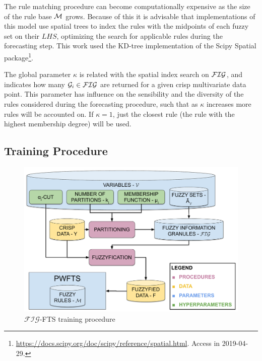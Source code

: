 The rule matching procedure can become computationally expensive as the size of the rule base $\mathcal{M}$ grows. Because of this it is advisable that implementations of this model use spatial trees \citep{Muja2014} to index the rules with the midpoints of each fuzzy set on their $LHS$, optimizing the search for applicable rules during the forecasting step. This work used the KD-tree implementation of the Scipy Spatial package\footnote{\url{https://docs.scipy.org/doc/scipy/reference/spatial.html}. Access in 2019-04-29.}.

The global parameter $\kappa$ is related with the spatial index search on $\mathcal{FIG}$, and indicates how many $\mathcal{G}_i \in \mathcal{FIG}$ are returned for a given crisp multivariate data point. This parameter has influence on the sensibility and the diversity of the rules considered during the forecasting procedure, such that as $\kappa$ increases more rules will be accounted on. If $\kappa = 1$, just the closest rule (the rule with the highest membership degree) will be used. 

\subsection{Training Procedure}
\label{sec:fig_training_procedure}

\begin{figure}
\centering
\includegraphics[width=\textwidth]{figures/figfts_training_procedure.pdf}
\caption{$\mathcal{FIG}$-FTS training procedure} 
\label{fig:figfts_training_procedure}
\end{figure}

